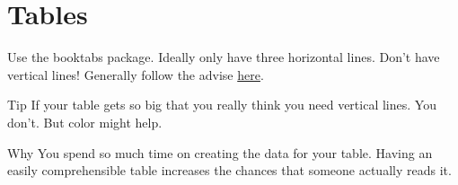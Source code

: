 \section{Tables}\label{sec:tables}

Use the booktabs package. Ideally only have three horizontal lines. Don't have vertical lines! Generally follow the advise \href{https://people.inf.ethz.ch/markusp/teaching/guides/guide-tables.pdf}{here}.

\begin{tipblock}{Tip} If your table gets so big that you really think you need vertical lines. You don't. But color might help.
\end{tipblock}

\begin{whyblock}{Why} You spend so much time on creating the data for your table. Having an easily comprehensible table increases the chances that someone actually reads it.
\end{whyblock}
